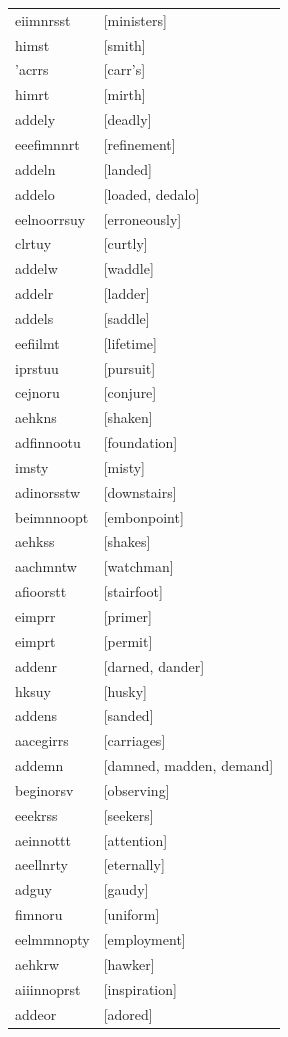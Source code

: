 \documentclass{article}
\begin{document}
\begin{tabular}{ll}
eiimnrsst & [ministers] \\
himst & [smith] \\
'acrrs & [carr's] \\
himrt & [mirth] \\
addely & [deadly] \\
eeefimnnrt & [refinement] \\
addeln & [landed] \\
addelo & [loaded, dedalo] \\
eelnoorrsuy & [erroneously] \\
clrtuy & [curtly] \\
addelw & [waddle] \\
addelr & [ladder] \\
addels & [saddle] \\
eefiilmt & [lifetime] \\
iprstuu & [pursuit] \\
cejnoru & [conjure] \\
aehkns & [shaken] \\
adfinnootu & [foundation] \\
imsty & [misty] \\
adinorsstw & [downstairs] \\
beimnnoopt & [embonpoint] \\
aehkss & [shakes] \\
aachmntw & [watchman] \\
afioorstt & [stairfoot] \\
eimprr & [primer] \\
eimprt & [permit] \\
addenr & [darned, dander] \\
hksuy & [husky] \\
addens & [sanded] \\
aacegirrs & [carriages] \\
addemn & [damned, madden, demand] \\
beginorsv & [observing] \\
eeekrss & [seekers] \\
aeinnottt & [attention] \\
aeellnrty & [eternally] \\
adguy & [gaudy] \\
fimnoru & [uniform] \\
eelmmnopty & [employment] \\
aehkrw & [hawker] \\
aiiinnoprst & [inspiration] \\
addeor & [adored] \\

\end{tabular}
\end{document}
